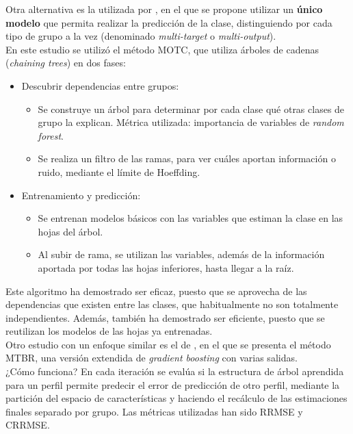 

Otra alternativa es la utilizada por \textcite{mastelini2019}, en el que se propone utilizar un \textbf{único modelo} que permita realizar la predicción de la clase, distinguiendo por cada tipo de grupo a la vez (denominado \textit{multi-target} o \textit{multi-output}).
\\

En este estudio se utilizó el método \gls{MOTC}, que utiliza árboles de cadenas (\textit{chaining trees}) en dos fases:
\begin{itemize}
  \item Descubrir dependencias entre grupos:
  \begin{itemize}
    \item Se construye un árbol para determinar por cada clase qué otras clases de grupo la explican. Métrica utilizada: importancia de variables de \textit{random forest}.
    \item Se realiza un filtro de las ramas, para ver cuáles aportan información o ruido, mediante el límite de Hoeffding.
  \end{itemize}
  \item Entrenamiento y predicción:
  \begin{itemize}
    \item Se entrenan modelos básicos con las variables que estiman la clase en las hojas del árbol.
    \item Al subir de rama, se utilizan las variables, además de la información aportada por todas las hojas inferiores, hasta llegar a la raíz.
  \end{itemize}
\end{itemize}

Este algoritmo ha demostrado ser eficaz, puesto que se aprovecha de las dependencias que existen entre las clases, que habitualmente no son totalmente independientes. Además, también ha demostrado ser eficiente, puesto que se reutilizan los modelos de las hojas ya entrenadas.
\\

Otro estudio con un enfoque similar es el de \textcite{lin2019}, en el que se presenta el método \gls{MTBR}, una versión extendida de \textit{gradient boosting} con varias salidas.
\\

¿Cómo funciona? En cada iteración se evalúa si la estructura de árbol aprendida para un perfil permite predecir el error de predicción de otro perfil, mediante la partición del espacio de características y haciendo el recálculo de las estimaciones finales separado por grupo. Las métricas utilizadas han sido \gls{RRMSE} y \gls{CRRMSE}.
\\

